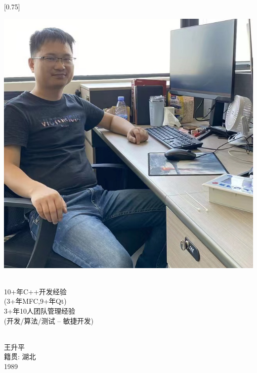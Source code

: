 \documentclass[lighthipster]{simplehipstercv}
\begin{document}
	\setlength{\columnsep}{1.5cm}
	[0.75]
	\begin{paracol}{2}
		
		
		
		
		\footnotesize
		{\setasidefontcolour
			\flushright
			\begin{center}
				\includegraphics[width=\linewidth]{ShowMe.jpg}
			\end{center}
			\bigskip
			
			\\[0.5em]
			
			{
				\footnotesize
				10+年C++开发经验\\
				\tiny
				(3+年MFC,9+年Qt)\\
				\footnotesize
				3+年10人团队管理经验\\
				\tiny
				(开发/算法/测试 -- 敏捷开发)
			}
			\bigskip
			
			 \\[0.5em]
			王升平\\
			籍贯: 湖北\\ 
			1989
			
}
\end{paracol}
\end{document}
